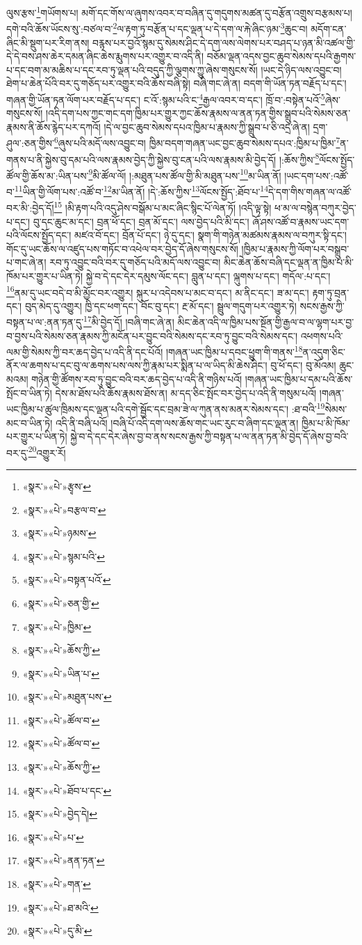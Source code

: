 ལུས་རྩས་\footnote{«སྣར་»«པེ་»རྩྭས་}གཡོགས་པ། མགོ་དང་གོས་ལ་ཞུགས་འབར་བ་བཞིན་དུ་གདུགས་མཚན་དུ་བརྩོན་འགྲུས་བརྩམས་པ། དགེ་བའི་ཆོས་ཡོངས་སུ་:བཙལ་བ་\footnote{«སྣར་»«པེ་»བརྩལ་བ་}ལ་རྟག་ཏུ་བརྩོན་པ་དང་ལྡན་པ་དེ་དག་ལ་རྐེ་ཞིང་ཉམ་\footnote{«སྣར་»«པེ་»ཉམས་}ཆུང་བ། མདོག་ངན་ཞིང་མི་སྡུག་པར་རིག་ནས། བརྙས་པར་བྱའོ་སྙམ་དུ་སེམས་ཤིང་དེ་དག་ལས་ལེགས་པར་བཤད་པ་ཉན་མི་འཚལ་གྱི་དེ་དེ་བས་ཤས་ཆེར་དམན་ཞིང་ཆེས་རྨུགས་པར་འགྱུར་བ་འདི་ནི། བཅོམ་ལྡན་འདས་བྱང་ཆུབ་སེམས་དཔའི་རྒྱགས་པ་དང་བག་མ་མཆིས་པ་དང་རབ་ཏུ་ལྡན་པའི་བདུད་ཀྱི་ལྕགས་ཀྱུ་ཞེས་གསུངས་སོ། །ཡང་དེ་ཉིད་ལས་འབྱུང་བ། ཐེག་པ་ཆེན་པོའི་བར་དུ་གཅོད་པར་འགྱུར་བའི་ཆོས་བཞི་སྟེ། བཞི་གང་ཞེ་ན། བདག་གི་ཡོན་ཏན་བརྗོད་པ་དང་། གཞན་གྱི་ཡོན་ཏན་ལོག་པར་བརྗོད་པ་དང་། ང་འོ་:སྙམ་པའི་ང་\footnote{«སྣར་»«པེ་»སྙམ་པའི་}རྒྱལ་འབར་བ་དང་། ཁྲོ་བ་:བསྟེན་པའོ་\footnote{«སྣར་»«པེ་»བསྟན་པའོ་}ཞེས་གསུངས་སོ། །འདི་དག་པས་ཀྱང་གང་དག་ཁྱིམ་པར་གྱུར་ཀྱང་ཆོས་རྣམས་ལ་ནན་ཏན་གྱིས་སྒྲུབ་པའི་སེམས་ཅན་རྣམས་ནི་ཆོས་རྙེད་པར་དཀའོ། །དེ་ལ་བྱང་ཆུབ་སེམས་དཔའ་ཁྱིམ་པ་རྣམས་ཀྱི་སྒྲུབ་པ་ཅི་འདྲ་ཞེ་ན། དྲག་ཤུལ་:ཅན་གྱིས་\footnote{«སྣར་»«པེ་»ཅན་གྱི་}ཞུས་པའི་མདོ་ལས་འབྱུང་བ། ཁྱིམ་བདག་གཞན་ཡང་བྱང་ཆུབ་སེམས་དཔའ་:ཁྱིམ་པ་ཁྱིམ་\footnote{«སྣར་»«པེ་»ཁྱིམ་}ན་གནས་པ་ནི་སྐྱེས་བུ་དམ་པའི་ལས་རྣམས་བྱེད་ཀྱི་སྐྱེས་བུ་ངན་པའི་ལས་རྣམས་མི་བྱེད་དོ། །:ཆོས་ཀྱིས་\footnote{«སྣར་»«པེ་»ཆོས་ཀྱི་}ལོངས་སྤྱོད་ཚོལ་གྱི་ཆོས་མ་:ཡིན་པས་\footnote{«སྣར་»«པེ་»ཡིན་པ་}མི་ཚོལ་ལོ། །:མཐུན་པས་ཚོལ་གྱི་མི་མཐུན་པས་\footnote{«སྣར་»«པེ་»མཐུན་པས་}མ་ཡིན་ནོ། །ཡང་དག་པས་:འཚོ་བ་\footnote{«སྣར་»«པེ་»ཚོལ་བ་}ཡིན་གྱི་ལོག་པས་:འཚོ་བ་\footnote{«སྣར་»«པེ་»ཚོལ་བ་}མ་ཡིན་ནོ། །དེ་:ཆོས་ཀྱིས་\footnote{«སྣར་»«པེ་»ཆོས་ཀྱི་}ལོངས་སྤྱོད་:ཐོབ་པ་\footnote{«སྣར་»«པེ་»ཐོབ་པ་དང་}དེ་དག་གིས་གཞན་ལ་འཚོ་བར་མི་:བྱེད་དོ།\footnote{«སྣར་»«པེ་»བྱེད་དེ།} །མི་རྟག་པའི་འདུ་ཤེས་བསྒོམ་པ་མང་ཞིང་སྙིང་པོ་ལེན་ཏོ། །འདི་ལྟ་སྟེ། ཕ་མ་ལ་བསྙེན་བཀུར་བྱེད་པ་དང་། བུ་དང་ཆུང་མ་དང་། བྲན་ཕོ་དང་། བྲན་མོ་དང་། ལས་བྱེད་པའི་མི་དང་། ཞོ་ཤས་འཚོ་བ་རྣམས་ཡང་དག་པའི་ལོངས་སྤྱོད་དང་། མཛའ་བོ་དང་། བྲོན་པོ་དང་། ཉེ་དུ་དང་། སྣག་གི་གཉེན་མཚམས་རྣམས་ལ་བཀུར་སྟི་དང་། གོང་དུ་ཡང་ཆོས་ལ་འཛུད་པས་གཏོང་བ་འཕེལ་བར་བྱེད་དོ་ཞེས་གསུངས་སོ། །ཁྱིམ་པ་རྣམས་ཀྱི་ལོག་པར་བསྒྲུབ་པ་གང་ཞེ་ན། རབ་ཏུ་འབྱུང་བའི་བར་དུ་གཅོད་པའི་མདོ་ལས་འབྱུང་བ། མིང་ཆེན་ཆོས་བཞི་དང་ལྡན་ན་ཁྱིམ་པ་མི་ཁོམ་པར་གྱུར་པ་ཡིན་ཏེ། སྐྱེ་བ་དེ་དང་དེར་དམུས་ལོང་དང་། བླུན་པ་དང་། ལྐུགས་པ་དང་། གདོལ་:པ་དང་། \footnote{«སྣར་»«པེ་»པ་}ནམ་དུ་ཡང་བདེ་བ་མི་མྱོང་བར་འགྱུར། སྐུར་པ་འདེབས་པ་མང་བ་དང་། མ་ནིང་དང་། ཟ་མ་དང་། རྟག་ཏུ་བྲན་དང་། བུད་མེད་དུ་འགྱུར། ཁྱི་དང་ཕག་དང་། བོང་བུ་དང་། རྔ་མོ་དང་། སྦྲུལ་གདུག་པར་འགྱུར་ཏེ། སངས་རྒྱས་ཀྱི་བསྟན་པ་ལ་:ནན་ཏན་དུ་\footnote{«སྣར་»«པེ་»ནན་ཏན་}མི་བྱེད་དོ། །བཞི་གང་ཞེ་ན། མིང་ཆེན་འདི་ལ་ཁྱིམ་པས་སྔོན་གྱི་རྒྱལ་བ་ལ་ལྷག་པར་བྱ་བ་བྱས་པའི་སེམས་ཅན་རྣམས་ཀྱི་མངོན་པར་བྱུང་བའི་སེམས་དང་རབ་ཏུ་བྱུང་བའི་སེམས་དང་། འཕགས་པའི་ལམ་གྱི་སེམས་ཀྱི་བར་ཆད་བྱེད་པ་འདི་ནི་དང་པོའོ། །གཞན་ཡང་ཁྱིམ་པ་དབང་ཕྱུག་གི་གནས་\footnote{«སྣར་»«པེ་»གན་}ན་འདུག་ཅིང་ནོར་ལ་ཆགས་པ་དང་བུ་ལ་ཆགས་པས་ལས་ཀྱི་རྣམ་པར་སྨིན་པ་ལ་ཡིད་མི་ཆེས་ཤིང་། བུ་ཕོ་དང་། བུ་མོའམ། ཆུང་མའམ། གཉེན་གྱི་ཚོགས་རབ་ཏུ་བྱུང་བའི་བར་ཆད་བྱེད་པ་འདི་ནི་གཉིས་པའོ། །གཞན་ཡང་ཁྱིམ་པ་དམ་པའི་ཆོས་སྤོང་བ་ཡིན་ཏེ། དེས་མ་ཐོས་པའི་ཆོས་རྣམས་ཐོས་ན། མ་དད་ཅིང་སྤོང་བར་བྱེད་པ་འདི་ནི་གསུམ་པའོ། །གཞན་ཡང་ཁྱིམ་པ་ཚུལ་ཁྲིམས་དང་ལྡན་པའི་དགེ་སྦྱོང་དང་བྲམ་ཟེ་ལ་ཀུན་ནས་མནར་སེམས་དང་། :ཐ་བའི་\footnote{«སྣར་»«པེ་»ཐ་མའི་}སེམས་མང་བ་ཡིན་ཏེ། འདི་ནི་བཞི་པའོ། །བཞི་པོ་འདི་དག་ལས་ཆོས་གང་ཡང་རུང་བ་ཞིག་དང་ལྡན་ན། ཁྱིམ་པ་མི་ཁོམ་པར་གྱུར་པ་ཡིན་ཏེ། སྐྱེ་བ་དེ་དང་དེར་ཞེས་བྱ་བ་ནས་སངས་རྒྱས་ཀྱི་བསྟན་པ་ལ་ནན་ཏན་མི་བྱེད་དོ་ཞེས་བྱ་བའི་བར་དུ་\footnote{«སྣར་»«པེ་»དུ་མི་}འགྱུར་རོ། 